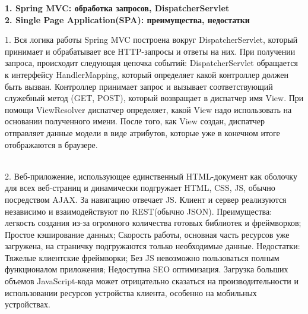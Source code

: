 \documentclass{article}
\newcommand{\bil}[4]{%
    \begin{minipage}{.3\textwidth}
        \textbf{1. #1} \\
        \textbf{2. #2}

        1. #3
        \\
        2. #4
    \end{minipage}
}
\begin{document}
\bil{Spring MVC: обработка запросов, DispatcherServlet}{Single Page Application(SPA): преимущества, недостатки}{
    Вся логика работы Spring MVC построена вокруг DispatcherServlet, который принимает и обрабатывает все HTTP-запросы и ответы на них. При получении запроса, происходит следующая цепочка событий: 
    DispatcherServlet обращается к интерфейсу HandlerMapping, который определяет какой контроллер должен быть вызван. 
    Контроллер принимает запрос и вызывает соответствующий служебный метод (GET, POST), который возвращает в диспатчер имя View.
    При помощи ViewResolver диспатчер определяет, какой View надо использовать на основании полученного имени.
    После того, как View создан, диспатчер отправляет данные модели в виде атрибутов, которые уже в конечном итоге отображаются в браузере.
}{
    Веб-приложение, использующее единственный HTML-документ как оболочку для всех веб-страниц и динамически подгружает HTML, CSS, JS, обычно посредством AJAX. За навигацию отвечает JS.
    Клиент и сервер реализуются независимо и взаимодействуют по REST(обычно JSON). 
    Преимущества: легкость создания из-за огромного количества готовых библиотек и фреймворков;
    Простое кэширование данных;
    Скорость работы, основная часть ресурсов уже загружена, на страничку подгружаются только необходимые данные.
    Недостатки: 
    Тяжелые клиентские фреймворки;
    Без JS невозможно пользоваться полным функционалом приложения;
    Недоступна SEO оптимизация.
    Загрузка больших объемов JavaScript-кода может отрицательно сказаться на производительности и использовании ресурсов устройства клиента, особенно на мобильных устройствах.
}
\hfill
\end{document}
